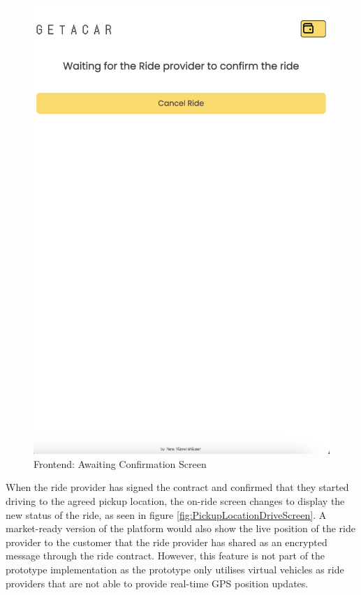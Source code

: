\begin{figure}[H]
\begin{minipage}{0.45\linewidth}
        \label{fig:RideOverviewScreen}
    \end{minipage}
    \hfill
    \begin{minipage}{0.45\linewidth}
        \centering
        \includegraphics[width=\linewidth]{data/ffss/6.png}
        \caption{Frontend: Awaiting Confirmation Screen}
        \label{fig:AwaitingConfirmationScreen}
    \end{minipage}
    
\end{figure}

When the ride provider has signed the contract and confirmed that they started driving to the agreed pickup location, the on-ride screen changes to display the new status of the ride, as seen in figure \ref{fig:PickupLocationDriveScreen}. A market-ready version of the platform would also show the live position of the ride provider to the customer that the ride provider has shared as an encrypted message through the ride contract. However, this feature is not part of the prototype implementation as the prototype only utilises virtual vehicles as ride providers that are not able to provide real-time GPS position updates.

